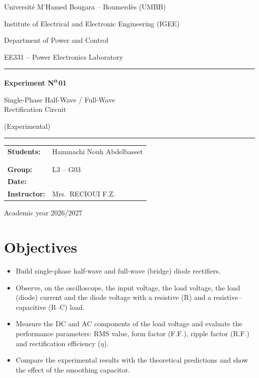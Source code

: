 \documentclass[11pt,a4paper]{article}
\newcommand{\studentA}{Hammachi Nouh Abdelbasset}
\newcommand{\studentB}{\dotfill}
\newcommand{\studentC}{\dotfill}
\newcommand{\group}{L3 -- G03}
\newcommand{\labdate}{\dotfill}
\begin{document}
\begin{titlepage}
\centering
{\large Université M'Hamed Bougara -- Boumerdès (UMBB)\par}
{\large Institute of Electrical and Electronic Engineering (IGEE)\par}
{Department of Power and Control\par}
\vspace{2.2cm}
{\Large EE331 -- Power Electronics Laboratory\par}
\vspace{0.8cm}
\rule{\linewidth}{1pt}\par\vspace{0.3cm}
{\Huge\bfseries Experiment N\textsuperscript{o}\,01\par}
\vspace{0.3cm}
{\LARGE Single-Phase Half-Wave / Full-Wave\\[2pt] Rectification Circuit\par}
\vspace{0.2cm}
{\large (Experimental)\par}
\rule{\linewidth}{1pt}\par
\vspace{2cm}
\begin{tabular}{>{\bfseries}l p{8cm}}
Students: & \studentA \\
          & \studentB \\
          & \studentC \\[4pt]
Group:    & \group \\[4pt]
Date:     & \labdate \\[4pt]
Instructor: & Mrs.\ RECIOUI F.Z.
\end{tabular}
\vfill
{\large Academic year 2026/2027\par}
\end{titlepage}

\tableofcontents
\newpage
\section{Objectives}
\begin{itemize}[nosep]
\item Build single-phase half-wave and full-wave (bridge) diode rectifiers.
\item Observe, on the oscilloscope, the input voltage, the load voltage, the load
      (diode) current and the diode voltage with a resistive (R) and a
      resistive--capacitive (R--C) load.
\item Measure the DC and AC components of the load voltage and evaluate the
      performance parameters: RMS value, form factor (F.F.), ripple factor (R.F.)
      and rectification efficiency ($\eta$).
\item Compare the experimental results with the theoretical predictions and
      show the effect of the smoothing capacitor.
\end{itemize}
\end{document}
